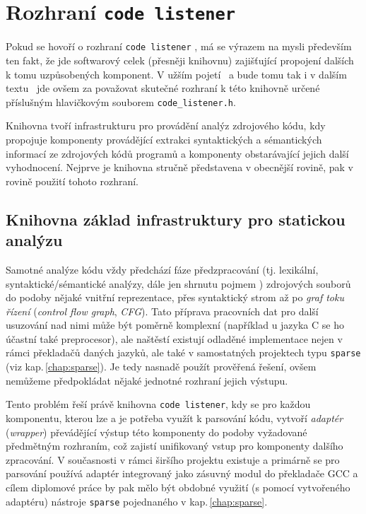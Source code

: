 \chapter{Rozhraní \texttt{code listener}}
\label{chap:code-listener}

Pokud se hovoří o rozhraní \texttt{code listener} \cite{web:FITVUTBR:VeriFIT:CodeListener},
má se výrazem  na mysli především ten fakt, že jde softwarový
celek (přesněji knihovnu) zajišťující propojení dalších k tomu uzpůsobených
komponent. V užším pojetí \ndash\ a bude tomu tak i v dalším textu \ndash\ jde ovšem
za  považovat skutečné rozhraní k této knihovně určené
příslušným hlavičkovým souborem \texttt{code\_listener.h}.

Knihovna tvoří infrastrukturu pro provádění analýz zdrojového kódu, kdy
propojuje komponenty provádějící extrakci syntaktických a sémantických
informací ze zdrojových kódů programů a komponenty obstarávající jejich
další vyhodnocení. Nejprve je knihovna stručně představena v obecnější rovině,
pak v rovině použití tohoto rozhraní.

\section{Knihovna základ infrastruktury pro statickou analýzu}

Samotné analýze kódu vždy předchází fáze předzpracování (tj. lexikální,
syntaktické/sémantické analýzy, dále jen shrnutu pojmem )
zdrojových souborů do podoby nějaké vnitřní reprezentace, přes syntaktický
strom až po \emph{graf toku řízení} (\emph{control flow graph}, \emph{CFG}).
Tato příprava pracovních dat pro další usuzování nad nimi může být
poměrně komplexní (například u jazyka C se ho účastní také preprocesor),
ale naštěstí existují odladěné implementace nejen v rámci překladačů
daných jazyků, ale také v samostatných projektech typu \texttt{sparse}
(viz kap.\,\ref{chap:sparse}). Je tedy nasnadě použít prověřená řešení, ovšem
nemůžeme předpokládat nějaké jednotné rozhraní jejich výstupu.

Tento problém řeší právě knihovna \texttt{code listener}, kdy se pro každou
komponentu, kterou lze a je potřeba využít k parsování kódu, vytvoří
\emph{adaptér} (\emph{wrapper}) převádějící výstup této komponenty
do podoby vyžadované předmětným rozhraním, což zajistí unifikovaný
vstup pro komponenty dalšího zpracování. V současnosti v rámci širšího
projektu existuje a primárně se pro parsování používá adaptér integrovaný
jako zásuvný modul do překladače GCC a cílem diplomové práce
by pak mělo být obdobné využití (s pomocí vytvořeného adaptéru) nástroje
\texttt{sparse} pojednaného v kap.\,\ref{chap:sparse}.

